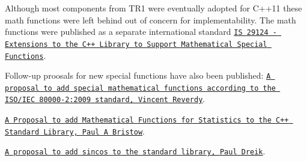 Although most components from T\+R1 were eventually adopted for C++11 these math functions were left behind out of concern for implementability. The math functions were published as a separate international standard \href{http://www.open-std.org/JTC1/SC22/WG21/docs/papers/2010/n3060.pdf}{\tt IS 29124 -\/ Extensions to the C++ Library to Support Mathematical Special Functions}.

Follow-\/up proosals for new special functions have also been published\+: \href{http://open-std.org/JTC1/SC22/WG21/docs/papers/2013/n3494.pdf}{\tt A proposal to add special mathematical functions according to the I\+S\+O/\+I\+EC 80000-\/2\+:2009 standard, Vincent Reverdy}.

\href{http://open-std.org/JTC1/SC22/WG21/docs/papers/2004/n1668.pdf}{\tt A Proposal to add Mathematical Functions for Statistics to the C++ Standard Library, Paul A Bristow}.

\href{http://www.open-std.org/jtc1/sc22/wg21/docs/papers/2015/p0081r0.pdf}{\tt A proposal to add sincos to the standard library, Paul Dreik}.

